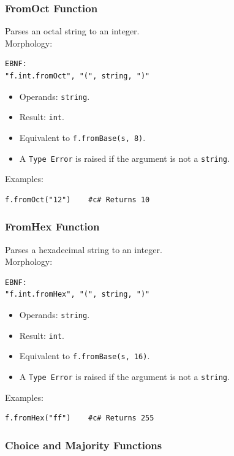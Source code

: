 \subsubsection{FromOct Function}
Parses an octal string to an integer. \\
Morphology:
\begin{verbatim}
EBNF:
"f.int.fromOct", "(", string, ")"
\end{verbatim}
\begin{itemize}
\item Operands: \texttt{string}.
\item Result: \texttt{int}.
\item Equivalent to \texttt{f.fromBase(s, 8)}.
\item A \texttt{Type Error} is raised if the argument is not a \texttt{string}.
\end{itemize}
Examples:
\begin{verbatim}
f.fromOct("12")    #c# Returns 10
\end{verbatim}

\subsubsection{FromHex Function}
Parses a hexadecimal string to an integer. \\
Morphology:
\begin{verbatim}
EBNF:
"f.int.fromHex", "(", string, ")"
\end{verbatim}
\begin{itemize}
\item Operands: \texttt{string}.
\item Result: \texttt{int}.
\item Equivalent to \texttt{f.fromBase(s, 16)}.
\item A \texttt{Type Error} is raised if the argument is not a \texttt{string}.
\end{itemize}
Examples:
\begin{verbatim}
f.fromHex("ff")    #c# Returns 255
\end{verbatim}

\subsubsection{Choice and Majority Functions}
